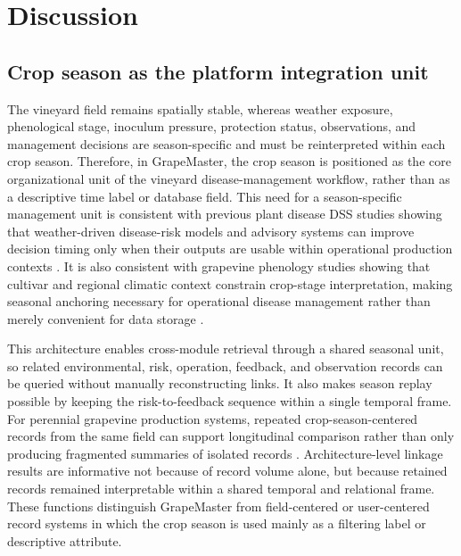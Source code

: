 \documentclass[12pt]{article}
\begin{document}
\section{Discussion}\label{discussion}

\subsection{Crop season as the platform integration unit}\label{crop-season-records-as-the-integration-unit}

The vineyard field remains spatially stable, whereas weather exposure, phenological stage, inoculum pressure, protection status, observations, and management decisions are season-specific and must be reinterpreted within each crop season. Therefore, in GrapeMaster, the crop season is positioned as the core organizational unit of the vineyard disease-management workflow, rather than as a descriptive time label or database field. This need for a season-specific management unit is consistent with previous plant disease DSS studies showing that weather-driven disease-risk models and advisory systems can improve decision timing only when their outputs are usable within operational production contexts \citep{seemForecastingPlantDisease2004,rossiAddressingImplementationProblem2014,bregaglioPublicDecisionSupport2022}. It is also consistent with grapevine phenology studies showing that cultivar and regional climatic context constrain crop-stage interpretation, making seasonal anchoring necessary for operational disease management rather than merely convenient for data storage \citep{parkerGeneralPhenologicalModel2011,wangAssessingGrapevinePhenological2020}.

This architecture enables cross-module retrieval through a shared seasonal unit, so related environmental, risk, operation, feedback, and observation records can be queried without manually reconstructing links. It also makes season replay possible by keeping the risk-to-feedback sequence within a single temporal frame. For perennial grapevine production systems, repeated crop-season-centered records from the same field can support longitudinal comparison rather than only producing fragmented summaries of isolated records \citep{nogueirajuniorModellingDynamicsGrapevine2018b}. Architecture-level linkage results are informative not because of record volume alone, but because retained records remained interpretable within a shared temporal and relational frame. These functions distinguish GrapeMaster from field-centered or user-centered record systems in which the crop season is used mainly as a filtering label or descriptive attribute.
\end{document}
